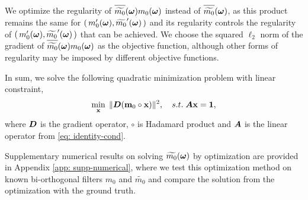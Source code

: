 We optimize the regularity of $\sbarm{0}m_0(\V{\omega})$ instead of $\sbarm{0}$, as this product remains the same for $(\,m_0'(\boldsymbol{\omega}), \widetilde{m_0}'(\boldsymbol{\omega})\,)$ and its regularity controls the regularity of $(\,m_0'(\boldsymbol{\omega}), \widetilde{m_0}'(\boldsymbol{\omega})\,)$ that can be achieved.
We choose the squared $\ell_2$ norm of the gradient of $\sbarm{0}m_0(\V{\omega})$ as the objective function, although other forms of regularity may be imposed by different objective functions.

In sum, we solve the following quadratic minimization problem with linear constraint,
\begin{align}\label{eq: opt}
\min_{\mathbf{x}}\; \Vert \boldsymbol{D}(\mathbf{m}_0\circ\mathbf{x})\Vert^2,\quad 
s.t. \; \boldsymbol{A}\mathbf{x} = \mathbf{1},
\end{align}
where $\boldsymbol{D}$ is the gradient operator, $\circ$ is Hadamard product and $\boldsymbol{A}$ is the linear operator from \eqref{eq: identity-cond}. 

Supplementary numerical results on solving $\widetilde{m_{0}}(\boldsymbol{\omega})$ by optimization are provided in Appendix \ref{app: supp-numerical}, where we test this optimization method on known bi-orthogonal filters $m_0$ and $\widetilde{m_0}$ and compare the solution from the optimization with the ground truth.

